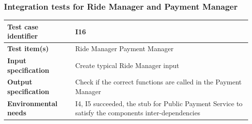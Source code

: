 \documentclass[a4paper,11pt]{report} %
\begin{document}
		\subsubsection{Integration tests for Ride Manager and Payment Manager} \label{sec:3.1.13}
			\begin{minipage}{\linewidth}
			\end{minipage}		
		\begin{center}
			\renewcommand{\arraystretch}{1.2}
			\setlength{\tabcolsep}{24pt}
			\begin{tabular}{ l  p{9cm}}\hline
				\textbf{Test case identifier} & I16\\\hline
				\textbf{Test item(s)} & Ride Manager \textrightarrow Payment Manager\\\hline
				\textbf{Input specification} & Create typical Ride Manager input \\\hline
				\textbf{Output specification} & Check if the correct functions are called in the Payment Manager\\\hline
				\textbf{Environmental needs} & I4, I5 succeeded, the stub for Public Payment Service to satisfy the components inter-dependencies\\\hline
			\end{tabular}
		\end{center}

		\pagebreak
\end{document}

